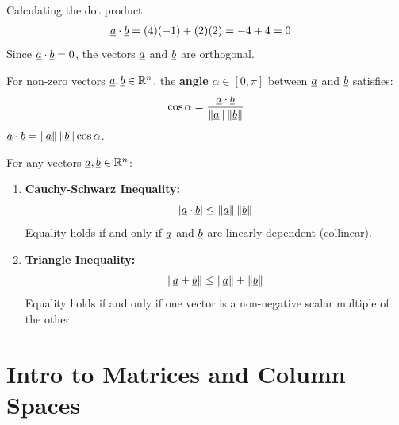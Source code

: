 \begin{solution}
    Calculating the dot product:
    \begin{align*}
        \underline{a} \cdot \underline{b} &= (4)(-1) + (2)(2) = -4 + 4 = 0
    \end{align*}
    Since $\underline{a} \cdot \underline{b} = 0$, the vectors $\underline{a}$ and $\underline{b}$ are orthogonal.
\end{solution}

\begin{definition}
    For non-zero vectors $\underline{a}, \underline{b} \in \mathbb{R}^n$, the \textbf{angle} $\alpha \in [0, \pi]$ between $\underline{a}$ and $\underline{b}$ satisfies:
    \[
        \cos\alpha = \frac{\underline{a} \cdot \underline{b}}{\left\| \underline{a} \right\|\left\| \underline{b} \right\|}
    \]
    $\underline{a} \cdot \underline{b} = \left\| \underline{a} \right\|\left\| \underline{b} \right\|\cos\alpha$.
\end{definition}

\begin{theorem}
    For any vectors $\underline{a}, \underline{b} \in \mathbb{R}^n$:
    \begin{enumerate}[label=\arabic*.]
        \item \textbf{Cauchy-Schwarz Inequality:}
            \[
                \left| \underline{a} \cdot \underline{b} \right| \le \left\| \underline{a} \right\|\left\| \underline{b} \right\|
            \]
            Equality holds if and only if $\underline{a}$ and $\underline{b}$ are linearly dependent (collinear).
            
        \item \textbf{Triangle Inequality:}
            \[
                \left\| \underline{a} + \underline{b} \right\| \le \left\| \underline{a} \right\| + \left\| \underline{b} \right\|
            \]
            Equality holds if and only if one vector is a non-negative scalar multiple of the other.
    \end{enumerate}
\end{theorem}



\newpage
\section{Intro to Matrices and Column Spaces}

